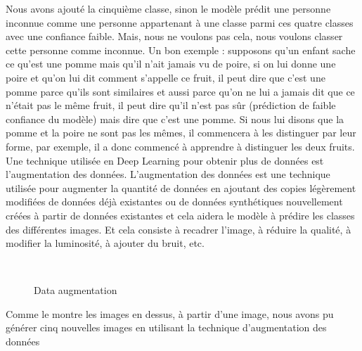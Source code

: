 {Nous avons ajouté la cinquième classe, sinon le modèle prédit une personne inconnue comme une personne appartenant à une classe parmi ces quatre classes avec une confiance faible. Mais, nous ne voulons pas cela, nous voulons classer cette personne comme inconnue. Un bon exemple : supposons qu'un enfant sache ce qu'est une pomme mais qu'il n'ait jamais vu de poire, si on lui donne une poire et qu'on lui dit comment s'appelle ce fruit, il peut dire que c'est une pomme parce qu'ils sont similaires et aussi parce qu'on ne lui a jamais dit que ce n'était pas le même fruit, il peut dire qu'il n'est pas sûr (prédiction de faible confiance du modèle) mais dire que c'est une pomme. Si nous lui disons que la pomme et la poire ne sont pas les mêmes, il commencera à les distinguer par leur forme, par exemple, il a donc commencé à apprendre à distinguer les deux fruits.\\[0.25cm]

Une technique utilisée en Deep Learning pour obtenir plus de données est l'augmentation des données. L'augmentation des données est une technique utilisée pour augmenter la quantité de données en ajoutant des copies légèrement modifiées de données déjà existantes ou de données synthétiques nouvellement créées à partir de données existantes et cela aidera le modèle à prédire les classes des différentes images. Et cela consiste à recadrer l'image, à réduire la qualité, à modifier la luminosité, à ajouter du bruit, etc.
\begin{figure}[H] 
\centering
{}\\[0.5cm]
\caption{Data augmentation}
\label{fig:figure5}
\end{figure}

Comme le montre les images en dessus, à partir d'une image, nous avons pu générer cinq nouvelles images en utilisant la technique d'augmentation des données

}
